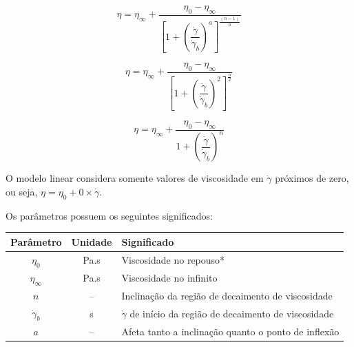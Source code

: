 		\begin{equation}
		\eta = \eta_{\infty} + \frac{\eta_0 - \eta_{\infty}}{\left[  1 + \left(  \dfrac{\dot{\gamma}}{\dot{\gamma}_b}  \right)^{a}  \right]^{\frac{ \left(  n - 1  \right) }{a}}}
		\label{eqn:AP_CarreauYasuda}
		\end{equation}
		
		\begin{equation}
		\eta = \eta_{\infty} + \frac{\eta_0 - \eta_{\infty}}{\left[  1 + \left(  \dfrac{\dot{\gamma}}{\dot{\gamma}_b}  \right)^{2}  \right]^{\frac{n}{2}}}
		\label{eqn:AP_Carreau}
		\end{equation}
		
		\begin{equation}
		\eta = \eta_{\infty} + \frac{\eta_0 - \eta_{\infty}}{1 + \left(  \dfrac{\dot{\gamma}}{\dot{\gamma}_b}  \right)^{n}}
		\label{eqn:AP_Cross}
		\end{equation}
		
		O modelo linear considera somente valores de viscosidade em \(\dot{\gamma}\) próximos de zero, ou seja, \(\eta = \eta_0 + 0 \times \dot{\gamma}\).
		
		Os parâmetros possuem os seguintes significados:
		
		\begin{table}[H]
			{%
				\begin{tabular}{c c p{9cm}}
					\toprule
					    Parâmetro      & Unidade   & Significado                                                       \\ \midrule
					    \(\eta_0\)     & Pa.s      & Viscosidade no repouso*                                           \\
					\(\eta_{\infty}\)  & Pa.s      & Viscosidade no infinito                                           \\
					      \(n\)        & --        & Inclinação da região de decaimento de viscosidade                 \\
					\(\dot{\gamma}_b\) & s\menosUm & \(\dot{\gamma}\) de início da região de decaimento de viscosidade \\ \midrule
					      \(a\)        & --        & Afeta tanto a inclinação quanto o ponto de inflexão               \\ \bottomrule
				\end{tabular}%
			}{}
		\end{table}
		
